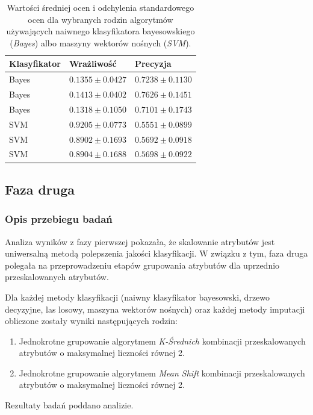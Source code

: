 \documentclass[../thesis.tex]{subfiles}
\begin{document}
\begin{table}[h]
\begin{center}
\begin{tabular}{ | l | l | l | }
\hline
\rowcolor{lightgray} Klasyfikator & Wrażliwość & Precyzja \\\hline

Bayes & $0.1355 \pm 0.0427$ & $0.7238 \pm 0.1130$\\\hline
Bayes & $0.1413 \pm 0.0402$ & $0.7626 \pm 0.1451$\\\hline
Bayes & $0.1318 \pm 0.1050$ & $0.7101 \pm 0.1743$\\\hline
SVM & $0.9205 \pm 0.0773$ & $0.5551 \pm 0.0899$\\\hline
SVM & $0.8902 \pm 0.1693$ & $0.5692 \pm 0.0918$\\\hline
SVM & $0.8904 \pm 0.1688$ & $0.5698 \pm 0.0922$\\\hline

\end{tabular}
\caption{Wartości średniej ocen i odchylenia standardowego ocen dla wybranych rodzin algorytmów używających naiwnego klasyfikatora bayesowskiego (\emph{Bayes}) albo maszyny wektorów nośnych (\emph{SVM}).}
\label{results:table_svm_bayes}
\end{center}
\end{table}

\subsection{Faza druga}

\subsubsection{Opis przebiegu badań}

Analiza wyników z fazy pierwszej pokazała, że skalowanie atrybutów jest uniwersalną metodą polepszenia jakości klasyfikacji. W związku z tym, faza druga polegała na przeprowadzeniu etapów grupowania atrybutów dla uprzednio przeskalowanych atrybutów.

Dla każdej metody klasyfikacji (naiwny klasyfikator bayesowski, drzewo decyzyjne, las losowy, maszyna wektorów nośnych) oraz każdej metody imputacji obliczone zostały wyniki następujących rodzin:
\begin{enumerate}
  \item Jednokrotne grupowanie algorytmem \emph{K-Średnich} kombinacji przeskalowanych atrybutów o maksymalnej liczności równej 2.
  \item Jednokrotne grupowanie algorytmem \emph{Mean Shift} kombinacji przeskalowanych atrybutów o maksymalnej liczności równej 2.
\end{enumerate}
Rezultaty badań poddano analizie.
\end{document}
